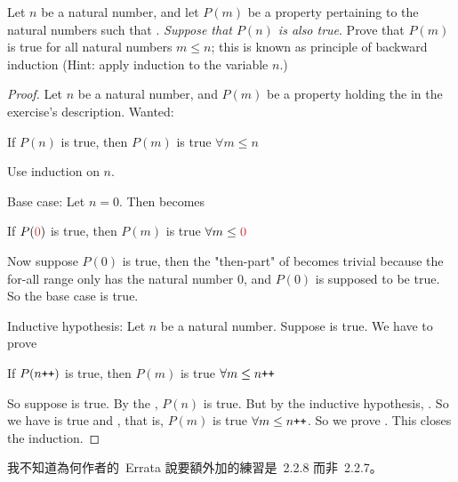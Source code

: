 \begin{exercise}\label{exercise 2.2.6}
Let \(n\) be a natural number, and let \(P(m)\) be a property pertaining to the natural numbers such that . \emph{Suppose that \(P(n)\) is also true}. Prove that \(P(m)\) is true for all natural numbers \(m \leq n\); this is known as principle of backward induction (Hint: apply induction to the variable \(n\).)
\end{exercise}
\begin{proof}
Let \(n\) be a natural number, and \(P(m)\) be a property holding the  in the exercise's description.
Wanted:
    \begin{center}
    If \(P(n)\) is true, then \(P(m)\) is true \(\forall m \leq n\)    
    \end{center}

Use induction on \(n\).

Base case: Let \(n = 0\). Then  becomes
    \begin{center}
    If \(P(\RED{0})\) is true, then \(P(m)\) is true \(\forall m \leq \RED{0}\) 
    \end{center}
Now suppose \(P(0)\) is true, then the "then-part" of  becomes trivial because the for-all range only has the natural number \(0\), and \(P(0)\) is supposed to be true. So the base case is true.

Inductive hypothesis: Let \(n\) be a natural number. Suppose  is true. We have to prove
    \begin{center}
    If \(P(n\texttt{++})\) is true, then \(P(m)\) is true \(\forall m \leq n\texttt{++}\)    
    \end{center}
So suppose  is true. By the , \(P(n)\) is true. But by the inductive hypothesis, . So we have  is true and , that is, \(P(m)\) is true \(\forall m \leq n\texttt{++}\). So we prove . This closes the induction.
\end{proof}

\begin{note}
我不知道為何作者的\ Errata 說要額外加的練習是\ 2.2.8 而非\ 2.2.7。
\end{note}

